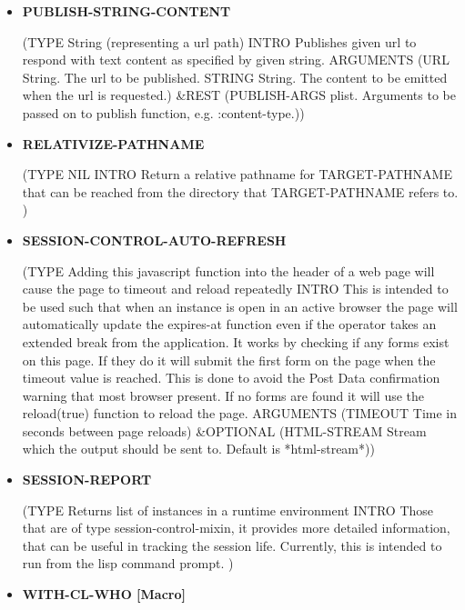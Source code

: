 \documentclass [11pt]{book}
\begin{document}
\begin{itemize}
\item {}
\label{prim:publish-string-content}
\textbf{PUBLISH-STRING-CONTENT}

(TYPE String (representing a url path) INTRO  Publishes given url to respond with text content as
specified by given string.
 ARGUMENTS (URL String. The url to be published. STRING String. The content to be emitted when the url is requested.) \&REST (PUBLISH-ARGS plist. Arguments to be passed on to publish function, e.g. :content-type.))



\item {}
\label{prim:relativize-pathname}
\textbf{RELATIVIZE-PATHNAME}

(TYPE NIL INTRO Return a relative pathname for TARGET-PATHNAME that can be reached
from the directory that TARGET-PATHNAME refers to.
)



\item {}
\label{prim:session-control-auto-refresh}
\textbf{SESSION-CONTROL-AUTO-REFRESH}

(TYPE Adding this javascript function into the header of a web page will cause the page to timeout and reload repeatedly INTRO  This is intended to be used such that when
an instance is open in an active browser the page will automatically update the expires-at function even if the operator takes an extended break from the application.
It works by checking if any forms exist on this page. If they do it will submit the first form on the page when the timeout value is reached. This is done to avoid
the Post Data confirmation warning that most browser present. If no forms are found it will use the reload(true) function to reload the page.
 ARGUMENTS (TIMEOUT Time in seconds between page reloads) \&OPTIONAL (HTML-STREAM Stream which the output should be sent to. Default is *html-stream*))



\item {}
\label{prim:session-report}
\textbf{SESSION-REPORT}

(TYPE Returns list of instances in a runtime environment INTRO  Those that are of type session-control-mixin, it provides more detailed information, that can be useful in tracking the session life. Currently, this is intended to run from the lisp command prompt.
)



\item {}
\label{prim:with-cl-who}
\textbf{WITH-CL-WHO [Macro]}


\end{itemize}
\end{document}

